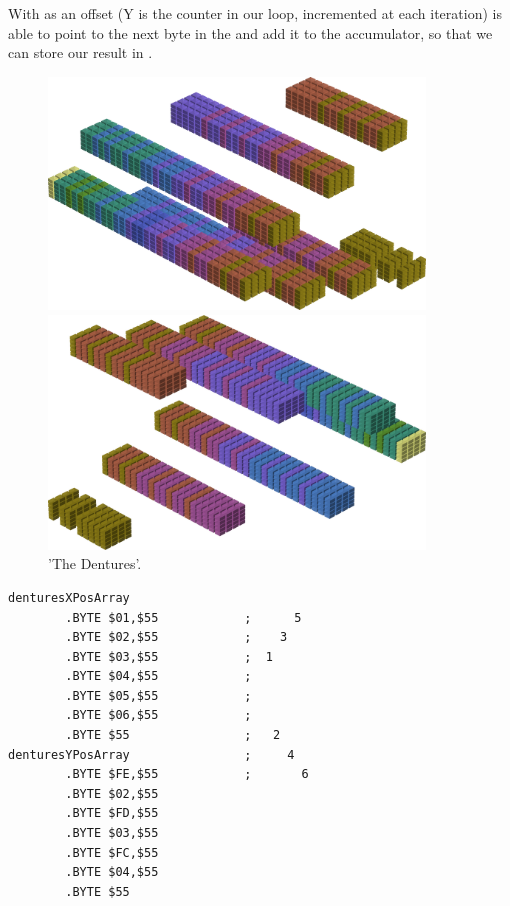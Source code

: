 With  as an offset  (Y is the counter in our loop,
incremented at each iteration)  is able to point to the next byte in the  and add it to
the accumulator, so that we can store our result in .
 
\clearpage
\begin{figure}[H]
    \centering
    \begin{adjustbox}{width=10cm,center}
      \includegraphics[width=10cm]{src/colorspace_patterns/pattern2-45.png}%
    \end{adjustbox}
    \begin{adjustbox}{width=10cm}
      \includegraphics[width=10cm]{src/colorspace_patterns/pattern2-225.png}%
    \end{adjustbox}
\caption{'The Dentures'.}
\end{figure}
\clearpage

\begin{lstlisting}
denturesXPosArray
        .BYTE $01,$55            ;      5 
        .BYTE $02,$55            ;    3   
        .BYTE $03,$55            ;  1     
        .BYTE $04,$55            ;        
        .BYTE $05,$55            ;        
        .BYTE $06,$55            ;        
        .BYTE $55                ;   2    
denturesYPosArray                ;     4  
        .BYTE $FE,$55            ;       6
        .BYTE $02,$55
        .BYTE $FD,$55
        .BYTE $03,$55
        .BYTE $FC,$55
        .BYTE $04,$55
        .BYTE $55

\end{lstlisting}


